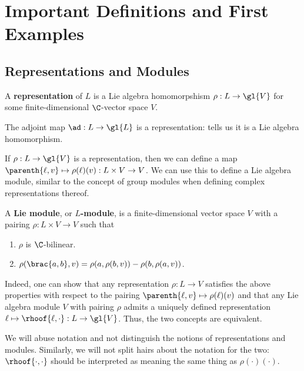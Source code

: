 \section{Important Definitions and First Examples}

\subsection{Representations and Modules}

\begin{boxdefinition}[Representation]\label{Ch2:Def:Representation}
    A \textbf{representation} of $L$ is a Lie algebra homomorpshism $\rho : L \to \gl{V}$ for some finite-dimensional $\C$-vector space $V$.
\end{boxdefinition}

\begin{boxexample}
    The adjoint map $\ad : L \to \gl{L}$ is a representation:  tells us it is a Lie algebra homomorphism.
\end{boxexample}

If $\rho : L \to \gl{V}$ is a representation, then we can define a map $\parenth{\ell, v} \mapsto \rho(\ell)(v) : L \times V \to V$. We can use this to define a Lie algebra module, similar to the concept of group modules when defining complex representations thereof.

\begin{boxdefinition}\label{Ch2:Def:LieAlgModule}
    A \textbf{Lie module}, or \textbf{$L$-module}, is a finite-dimensional vector space $V$ with a pairing $\rho : L \times V \to V$ such that
    \begin{enumerate}
        \item $\rho$ is $\C$-bilinear.
        \item $\rho(\brac{a, b}, v) = \rho(a, \rho(b, v)) - \rho(b, \rho(a, v))$.
    \end{enumerate}
\end{boxdefinition}

Indeed, one can show that any representation $\rho : L \to V$ satisfies the above properties with respect to the pairing $\parenth{\ell, v} \mapsto \rho(\ell)(v)$ and that any Lie algebra module $V$ with pairing $\rho$ admits a uniquely defined representation $\ell \mapsto \rhoof{\ell, \cdot} : L \to \gl{V}$. Thus, the two concepts are equivalent.

\begin{boxconvention}
    We will abuse notation and not distinguish the notions of representations and modules. Similarly, we will not split hairs about the notation for the two: $\rhoof{\cdot, \cdot}$ should be interpreted as meaning the same thing as $\rho(\cdot)(\cdot)$.
\end{boxconvention}

